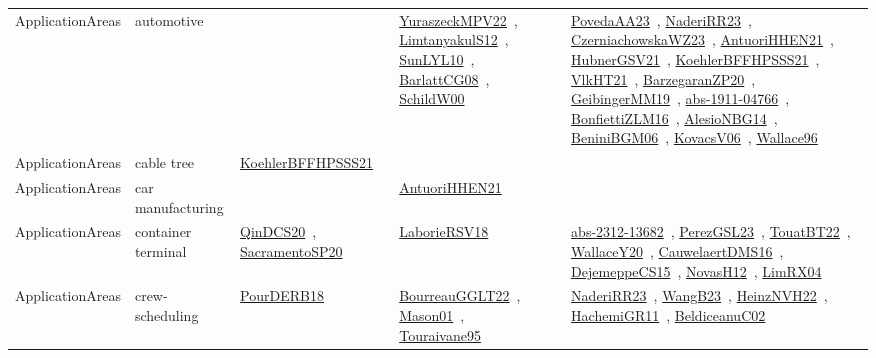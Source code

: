 {\begin{longtable}{lp{3cm}>{\raggedright\arraybackslash}p{6cm}>{\raggedright\arraybackslash}p{6cm}>{\raggedright\arraybackslash}p{8cm}}
ApplicationAreas & automotive &  & \href{articles/YuraszeckMPV22.pdf}{YuraszeckMPV22}~\cite{YuraszeckMPV22}, \href{articles/LimtanyakulS12.pdf}{LimtanyakulS12}~\cite{LimtanyakulS12}, \href{papers/SunLYL10.pdf}{SunLYL10}~\cite{SunLYL10}, \href{papers/BarlattCG08.pdf}{BarlattCG08}~\cite{BarlattCG08}, \href{articles/SchildW00.pdf}{SchildW00}~\cite{SchildW00} & \href{papers/PovedaAA23.pdf}{PovedaAA23}~\cite{PovedaAA23}, \href{articles/NaderiRR23.pdf}{NaderiRR23}~\cite{NaderiRR23}, \href{articles/CzerniachowskaWZ23.pdf}{CzerniachowskaWZ23}~\cite{CzerniachowskaWZ23}, \href{papers/AntuoriHHEN21.pdf}{AntuoriHHEN21}~\cite{AntuoriHHEN21}, \href{articles/HubnerGSV21.pdf}{HubnerGSV21}~\cite{HubnerGSV21}, \href{articles/KoehlerBFFHPSSS21.pdf}{KoehlerBFFHPSSS21}~\cite{KoehlerBFFHPSSS21}, \href{articles/VlkHT21.pdf}{VlkHT21}~\cite{VlkHT21}, \href{papers/BarzegaranZP20.pdf}{BarzegaranZP20}~\cite{BarzegaranZP20}, \href{papers/GeibingerMM19.pdf}{GeibingerMM19}~\cite{GeibingerMM19}, \href{articles/abs-1911-04766.pdf}{abs-1911-04766}~\cite{abs-1911-04766}, \href{papers/BonfiettiZLM16.pdf}{BonfiettiZLM16}~\cite{BonfiettiZLM16}, \href{papers/AlesioNBG14.pdf}{AlesioNBG14}~\cite{AlesioNBG14}, \href{papers/BeniniBGM06.pdf}{BeniniBGM06}~\cite{BeniniBGM06}, \href{papers/KovacsV06.pdf}{KovacsV06}~\cite{KovacsV06}, \href{articles/Wallace96.pdf}{Wallace96}~\cite{Wallace96}\\
ApplicationAreas & cable tree & \href{articles/KoehlerBFFHPSSS21.pdf}{KoehlerBFFHPSSS21}~\cite{KoehlerBFFHPSSS21} &  & \\
ApplicationAreas & car manufacturing &  & \href{papers/AntuoriHHEN21.pdf}{AntuoriHHEN21}~\cite{AntuoriHHEN21} & \\
ApplicationAreas & container terminal & \href{articles/QinDCS20.pdf}{QinDCS20}~\cite{QinDCS20}, \href{articles/SacramentoSP20.pdf}{SacramentoSP20}~\cite{SacramentoSP20} & \href{articles/LaborieRSV18.pdf}{LaborieRSV18}~\cite{LaborieRSV18} & \href{articles/abs-2312-13682.pdf}{abs-2312-13682}~\cite{abs-2312-13682}, \href{papers/PerezGSL23.pdf}{PerezGSL23}~\cite{PerezGSL23}, \href{papers/TouatBT22.pdf}{TouatBT22}~\cite{TouatBT22}, \href{articles/WallaceY20.pdf}{WallaceY20}~\cite{WallaceY20}, \href{papers/CauwelaertDMS16.pdf}{CauwelaertDMS16}~\cite{CauwelaertDMS16}, \href{papers/DejemeppeCS15.pdf}{DejemeppeCS15}~\cite{DejemeppeCS15}, \href{articles/NovasH12.pdf}{NovasH12}~\cite{NovasH12}, \href{papers/LimRX04.pdf}{LimRX04}~\cite{LimRX04}\\
ApplicationAreas & crew-scheduling & \href{articles/PourDERB18.pdf}{PourDERB18}~\cite{PourDERB18} & \href{articles/BourreauGGLT22.pdf}{BourreauGGLT22}~\cite{BourreauGGLT22}, \href{articles/Mason01.pdf}{Mason01}~\cite{Mason01}, \href{papers/Touraivane95.pdf}{Touraivane95}~\cite{Touraivane95} & \href{articles/NaderiRR23.pdf}{NaderiRR23}~\cite{NaderiRR23}, \href{papers/WangB23.pdf}{WangB23}~\cite{WangB23}, \href{articles/HeinzNVH22.pdf}{HeinzNVH22}~\cite{HeinzNVH22}, \href{articles/HachemiGR11.pdf}{HachemiGR11}~\cite{HachemiGR11}, \href{papers/BeldiceanuC02.pdf}{BeldiceanuC02}~\cite{BeldiceanuC02}\\

\end{longtable}}
